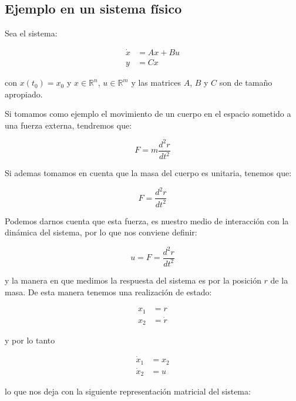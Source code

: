 	\subsection{Ejemplo en un sistema físico}

		Sea el sistema:

		\begin{align*}
			\dot{x} &= A x + B u \\
			y &= C x
		\end{align*}

		con $x(t_0) = x_0$ y $x \in \mathbb{R}^n$, $u \in \mathbb{R}^m$ y las matrices $A$, $B$ y $C$ son de tamaño apropiado.

		Si tomamos como ejemplo el movimiento de un cuerpo en el espacio sometido a una fuerza externa, tendremos que:

		\begin{equation*}
			F = m \frac{d^2 r}{dt^2}
		\end{equation*}

		Si ademas tomamos en cuenta que la masa del cuerpo es unitaria, tenemos que:

		\begin{equation*}
			F = \frac{d^2 r}{dt^2}
		\end{equation*}

		Podemos darnos cuenta que esta fuerza, es nuestro medio de interacción con la dinámica del sistema, por lo que nos conviene definir:

		\begin{equation*}
			u = F = \frac{d^2 r}{dt^2}
		\end{equation*}

		y la manera en que medimos la respuesta del sistema es por la posición $r$ de la masa.
		De esta manera tenemos una realización de estado:

		\begin{align*}
			x_1 &= r \\
			x_2 &= \dot{r}
		\end{align*}

		y por lo tanto

		\begin{align*}
			\dot{x}_1 &= x_2 \\
			\dot{x}_2 &= u
		\end{align*}

		lo que nos deja con la siguiente representación matricial del sistema:

